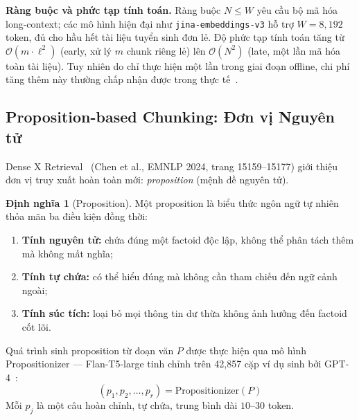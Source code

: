 \documentclass[12pt,a4paper]{report}
\theoremstyle{plain}
\theoremstyle{definition}
\newtheorem{dinhnghia}{Định nghĩa}[chapter]
\begin{document}
	\textbf{Ràng buộc và phức tạp tính toán.} Ràng buộc $N \leq W$ yêu cầu bộ
	mã hóa long-context; các mô hình hiện đại như \texttt{jina-embeddings-v3}
	hỗ trợ $W = 8{,}192$ token, đủ cho hầu hết tài liệu tuyển sinh đơn lẻ.
	Độ phức tạp tính toán tăng từ $\mathcal{O}(m \cdot \ell^2)$ (early, xử lý
	$m$ chunk riêng lẻ) lên $\mathcal{O}(N^2)$ (late, một lần mã hóa toàn
	tài liệu). Tuy nhiên do chỉ thực hiện một lần trong giai đoạn offline,
	chi phí tăng thêm này thường chấp nhận được trong thực tế~\cite{gunther2024late}.
	
	\subsection{Proposition-based Chunking: Đơn vị Nguyên tử}
	\label{subsec:proposition}
	
	Dense X Retrieval~\cite{chen2024dense} (Chen et al., EMNLP 2024, trang
	15159--15177) giới thiệu đơn vị truy xuất hoàn toàn mới: \emph{proposition}
	(mệnh đề nguyên tử).
	
	\begin{dinhnghia}[Proposition]
		\label{def:proposition}
		Một proposition là biểu thức ngôn ngữ tự nhiên thỏa mãn ba điều kiện đồng
		thời:
		\begin{enumerate}[label=(\roman*)]
			\item \textbf{Tính nguyên tử:} chứa đúng một factoid độc lập, không
			thể phân tách thêm mà không mất nghĩa;
			\item \textbf{Tính tự chứa:} có thể hiểu đúng mà không cần tham chiếu
			đến ngữ cảnh ngoài;
			\item \textbf{Tính súc tích:} loại bỏ mọi thông tin dư thừa không ảnh
			hưởng đến factoid cốt lõi.
		\end{enumerate}
	\end{dinhnghia}
	
	Quá trình sinh proposition từ đoạn văn $P$ được thực hiện qua mô hình
	Propositionizer --- Flan-T5-large tinh chỉnh trên 42,857 cặp ví dụ sinh
	bởi GPT-4~\cite{chen2024dense}:
	\begin{equation}
		(p_1, p_2, \ldots, p_r) = \text{Propositionizer}(P)
		\label{eq:propositionizer}
	\end{equation}
	Mỗi $p_j$ là một câu hoàn chỉnh, tự chứa, trung bình dài $10$--$30$ token.
	
\end{document}
